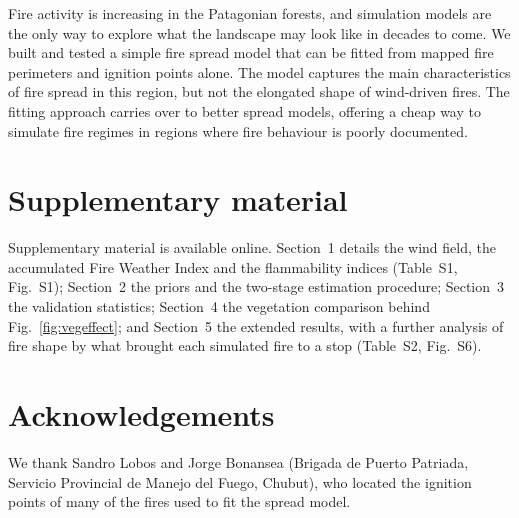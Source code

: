 \documentclass[ResearchPaper,linenum]{CSIRO_LaTeX_Template}
\begin{document}

\begin{onlinesummarytext}
Fire activity is increasing in the Patagonian forests, and
simulation models are the only way to explore what the landscape may look like in
decades to come. We built and tested a simple fire spread model that can be fitted
from mapped fire perimeters and ignition points alone. The model 
captures the main characteristics of fire spread in this region,
but not the elongated shape of wind-driven fires.
The fitting approach carries over to better spread models, offering a cheap way to
simulate fire regimes in regions where fire behaviour is poorly documented.
\end{onlinesummarytext}

\section{Supplementary material}

Supplementary material is available online. Section~1 details the wind field, the
accumulated Fire Weather Index and the flammability indices (Table~S1, Fig.~S1);
Section~2 the priors and the two-stage estimation procedure; Section~3 the validation
statistics; Section~4 the vegetation comparison behind Fig.~\ref{fig:vegeffect}; and
Section~5 the extended results, with a further analysis of fire shape by what brought
each simulated fire to a stop (Table~S2, Fig.~S6).

\section{Acknowledgements}

We thank Sandro Lobos and Jorge Bonansea (Brigada de Puerto Patriada, Servicio Provincial
de Manejo del Fuego, Chubut), who located the ignition points of many of the fires used to
fit the spread model.
\end{document}
